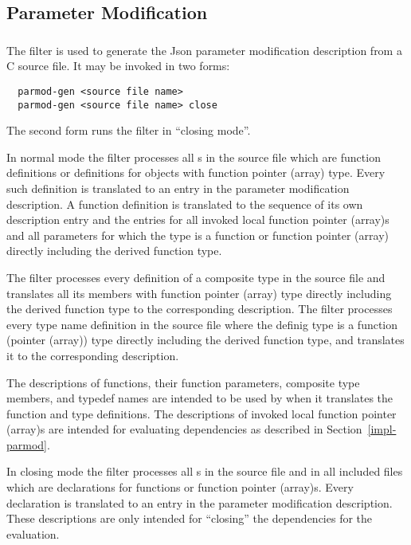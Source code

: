 \subsection{Parameter Modification}
\label{impl-ccomps-parmod}

\subsubsection{}

The filter  is used to generate the Json parameter modification description from a C source file.
It may be invoked in two forms:
\begin{verbatim}
  parmod-gen <source file name>
  parmod-gen <source file name> close
\end{verbatim}
The second form runs the filter in ``closing mode''.

In normal mode the filter processes all s in the source file which are function
definitions or definitions for objects with function pointer (array) type. Every such definition is translated to an
entry in the parameter modification description. A function definition is translated to the sequence of its
own description entry and the entries for all invoked local function pointer (array)s and all parameters for which
the type is a function or function pointer (array) directly including the derived function type.

The filter processes every definition of a composite type in the source file and translates all
its members with function pointer (array) type directly including the derived function type to the corresponding
description. The filter processes every type name definition in the source file where the definig type
is a function (pointer (array)) type directly including the derived function type, and translates it to
the corresponding description.

The descriptions of functions, their function parameters, composite type members, and typedef names are 
intended to be used by 
when it translates the function and type definitions. The descriptions of invoked local function pointer (array)s
are intended for evaluating dependencies as described in Section~\ref{impl-parmod}.

In closing mode the filter processes all s in the source file and in all included files which
are declarations for functions or function pointer (array)s. Every declaration is translated to an entry in the parameter
modification description. These descriptions are only intended for ``closing'' the dependencies for the evaluation.

